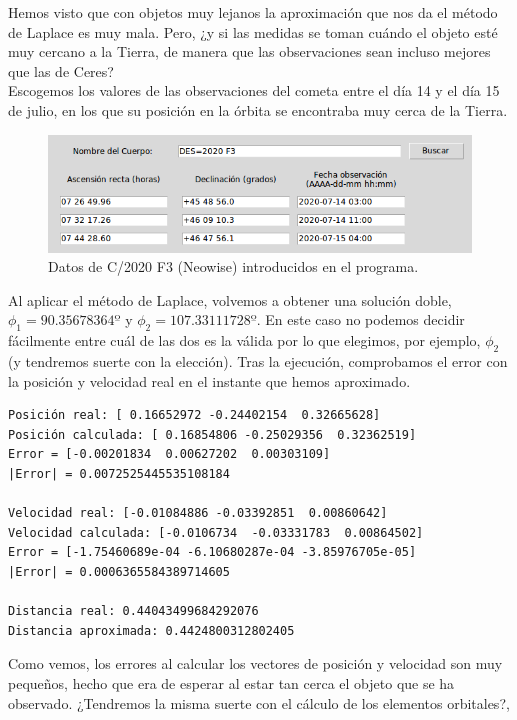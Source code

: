 \documentclass[11pt]{book}
\begin{document}
Hemos visto que con objetos muy lejanos la aproximación que nos da el método de Laplace es muy mala. Pero, ¿y si las medidas se toman cuándo el objeto esté muy cercano a la Tierra, de manera que las observaciones sean incluso mejores que las de Ceres?\\

Escogemos los valores de las observaciones del cometa entre el día 14 y el día 15 de julio, en los que su posición en la órbita se encontraba muy cerca de la Tierra.
\begin{figure}[H]
\centering
\includegraphics[scale=0.5]{images/neowise_exp.png}
\caption{Datos de C/2020 F3 (Neowise) introducidos en el programa.}
\label{fig:neowise_exp}
\end{figure}

Al aplicar el método de Laplace, volvemos a obtener una solución doble, $\phi_1=90.35678364º$ y $\phi_2=107.33111728º$. En este caso no podemos decidir fácilmente entre cuál de las dos es la válida por lo que elegimos, por ejemplo, $\phi_2$ (y tendremos suerte con la elección). Tras la ejecución, comprobamos el error con la posición y velocidad real en el instante que hemos aproximado.
\begin{lstlisting}[style=Console]
Posición real: [ 0.16652972 -0.24402154  0.32665628]
Posición calculada: [ 0.16854806 -0.25029356  0.32362519]
Error = [-0.00201834  0.00627202  0.00303109]
|Error| = 0.0072525445535108184

Velocidad real: [-0.01084886 -0.03392851  0.00860642]
Velocidad calculada: [-0.0106734  -0.03331783  0.00864502]
Error = [-1.75460689e-04 -6.10680287e-04 -3.85976705e-05]
|Error| = 0.0006365584389714605

Distancia real: 0.44043499684292076
Distancia aproximada: 0.4424800312802405
\end{lstlisting}

Como vemos, los errores al calcular los vectores de posición y velocidad son muy pequeños, hecho que era de esperar al estar tan cerca el objeto que se ha observado. ¿Tendremos la misma suerte con el cálculo de los elementos orbitales?,\\
\end{document}

